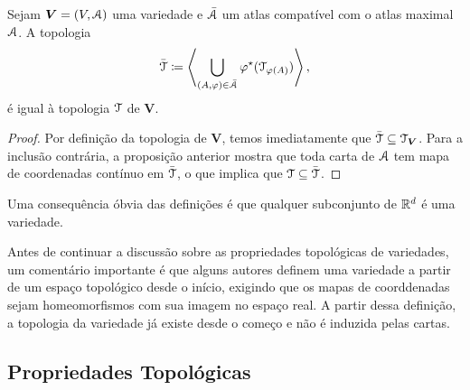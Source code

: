 \begin{prop}
Sejam $\bm V=(V,\mathcal{A})$ uma variedade e $\bar{\mathcal{A}}$ um atlas compatível com o atlas maximal $\mathcal{A}$. A topologia
	\begin{equation*}
	\bar{\mathcal{T}} \coloneqq \left\langle \bigcup_{(A,\varphi) \in \bar{\mathcal{A}}} \varphi^\star(\mathcal{T}_{\varphi(A)}) \right\rangle,
	\end{equation*}
é igual à topologia $\mathcal{T}$ de $\bm V$.
\end{prop}
\begin{proof}
Por definição da topologia de $\bm V$, temos imediatamente que $\bar{\mathcal{T}} \subseteq \mathcal{T}_{\bm V}$. Para a inclusão contrária, a proposição anterior mostra que toda carta de $\mathcal{A}$ tem mapa de coordenadas contínuo em $\bar{\mathcal{T}}$, o que implica que $\mathcal{T} \subseteq \bar{\mathcal{T}}$.
\end{proof}

Uma consequência óbvia das definições é que qualquer subconjunto de $\mathbb{R}^d$ é uma variedade.

Antes de continuar a discussão sobre as propriedades topológicas de variedades, um comentário importante é que alguns autores definem uma variedade a partir de um espaço topológico desde o início, exigindo que os mapas de coorddenadas sejam homeomorfismos com sua imagem no espaço real. A partir dessa definição, a topologia da variedade já existe desde o começo e não é induzida pelas cartas.

\subsection{Propriedades Topológicas}


